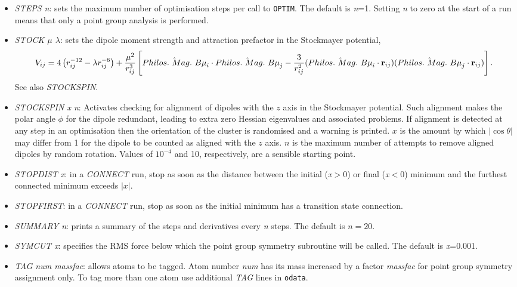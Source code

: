 \documentclass[12pt,a4paper,dvips]{article}
\begin{document}
\begin{itemize}
\item {\it STEPS n\/}: sets the maximum number of optimisation steps per call
to {\tt OPTIM}. The default is {\it n\/}=1. Setting {\it n\/} to zero at the start of a run
means that only a point group analysis is performed.

\item {\it STOCK $\mu$ $\lambda$}: sets the dipole moment strength and attraction prefactor
in the Stockmayer potential,
\begin{displaymath}
V_{ij} = 4\left(r_{ij}^{-12}-\lambda r_{ij}^{-6}\right) + \frac{\mu^2}{r_{ij}^3}
\left[\hat{\pmb\mu}_i\cdot\hat{\pmb\mu}_j-\frac{3}{r_{ij}^2}
(\hat{\pmb\mu}_i\cdot{\bf r}_{ij})(\hat{\pmb\mu}_j\cdot{\bf r}_{ij})\right].
\end{displaymath}
See also {\it STOCKSPIN}.

\item {\it STOCKSPIN x n}: Activates checking for alignment of dipoles with the $z$ axis in
the Stockmayer potential.  Such alignment makes the polar angle $\phi$ for the dipole
redundant, leading to extra zero Hessian eigenvalues and associated problems.  If alignment
is detected at any step in an optimisation then the orientation of the cluster is randomised
and a warning is printed.
$x$ is the amount by which $|\cos\theta|$ may differ from 1 for the dipole to be counted as
aligned with the $z$ axis.  $n$ is the maximum number of attempts to remove aligned dipoles
by random rotation.  Values of $10^{-4}$ and 10, respectively, are a sensible starting point.

\item {\it STOPDIST x\/}: in a {\it CONNECT\/} run, stop as soon as the distance between
the initial ({\it x}$>0$) or final ({\it x}$<0$) minimum and the furthest connected minimum
exceeds $|x|$.

\item {\it STOPFIRST\/}: in a {\it CONNECT\/} run, stop as soon as the initial minimum has a transition state
connection.

\item {\it SUMMARY n\/}: prints a summary of the steps and derivatives
every {\it n\/} steps. The default is $n=20$.

\item {\it SYMCUT x\/}: specifies the RMS force below which the point
group symmetry subroutine will be called. The default is {\it x\/}=0.001.

\item {\it TAG num massfac\/}:
allows atoms to be tagged. Atom number {\it num\/} has its mass increased
by a factor {\it massfac\/} for point group symmetry assignment only.
To tag more than one atom use additional {\it TAG\/} lines in {\tt odata}.


\end{itemize}
\end{document}
